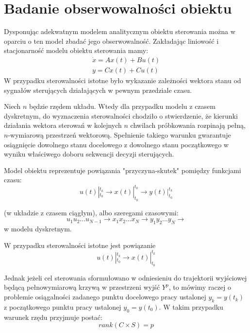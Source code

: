 \documentclass{article}
\begin{document}
	\maketitle
	\section{Badanie obserwowalności obiektu}
		Dysponując adekwatnym modelem analitycznym obiektu sterowania można w oparciu
		o ten model zbadać jego obserwowalność.
		Zakładając liniowość i stacjonarność modelu obiektu sterowania mamy:
		\begin{align*}
			\dot{x} = Ax(t)+Bu(t) \\
			y = Cx(t)+Cu(t) 
		\end{align*}
		W przypadku sterowalności istotne było wykazanie zależności
		wektora stanu od sygnałów sterujących działających w pewnym przedziale czasu.

		Niech $n$ będzie rzędem układu. Wtedy 
		dla przypadku modelu z czasem dyskretnym, do wyznaczenia sterowalności
		chodziło o stwierdzenie, że kierunki
		działania wektora sterowań w kolejnych $n$ chwilach próbkowania 
		rozpinają pełną, $n$-wymiarową przestrzeń wektorową. Spełnienie takiego warunku gwarantuje
		osiągnięcie dowolnego stanu docelowego z dowolnego stanu początkowego w wyniku
		właściwego doboru sekwencji decyzji sterujących.

		Model obiektu reprezentuje powiązania "przyczyna-skutek" pomiędzy funkcjami czasu:
		\begin{equation}
			u(t)|^{t_k}_{t_0} \rightarrow x(t)|^{t_k}_{t_0} \rightarrow y(t)|^{t_k}_{t_0} 
		\end{equation}

		(w układzie z czasem ciągłym), albo szeregami czasowymi:
		\begin{equation}
			{u_1 u_2 \ldots u_{N-1}} \rightarrow{x_1 x_2 \ldots x_{N}} \rightarrow {y_1 y_2 \ldots y_{N}} \rightarrow
		\end{equation}
		w modelu dyskretnym.

		W przypadku sterowalności istotne jest powiązanie
		\begin{equation}
			u(t)|^{t_k}_{t_0} \rightarrow x(t)|^{t_k}_{t_0} 
		\end{equation}

		Jednak jeżeli cel sterowania sformułowano w odniesieniu do trajektorii wyjściowej
		będącą pełnowymiarową krzywą w przestrzeni wyjść $Y^p$, to mówimy raczej o problemie
		osiągalności zadanego punktu docelowego pracy ustalonej $y_k= y(t_k)$ z początkowego
		punktu pracy ustalonej $y_0= y(t_0)$. W takim przypadku warunek rzędu przyjmuje postać:
		\begin{equation}
			rank(C \times S) = p
		\end{equation}
\end{document}
